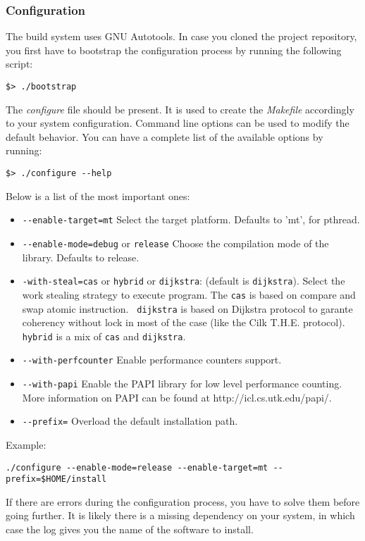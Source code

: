 \documentclass{article}
\begin{document}
\subsubsection{Configuration}
The build system uses GNU Autotools.
In case you cloned the project repository, you first have to bootstrap the
configuration process by running the following script:
\begin{verbatim}
$> ./bootstrap
\end{verbatim}
The \textit{configure} file should be present. It is used to create the
\textit{Makefile} accordingly to your system configuration. Command line
options can be used to modify the default behavior. You can have a complete
list of the available options by running:
\begin{verbatim}
$> ./configure --help
\end{verbatim}



Below is a list of the most important ones:
\begin{itemize} %
\item \verb+--enable-target=mt+\newline
Select the target platform. Defaults to 'mt', for pthread.
\item \verb+--enable-mode=debug+ or \verb+release+\newline
Choose the compilation mode of the library. Defaults to release.
\item \verb+-with-steal=cas+ or \verb+hybrid+ or \verb+dijkstra+: (default is \verb+dijkstra+). Select the work stealing strategy to execute program. The \verb+cas+ is based on compare and swap atomic instruction. \verb+ dijkstra+ is based on Dijkstra protocol to garante coherency without lock in most of the case (like the Cilk T.H.E. protocol). \verb+hybrid+ is a  mix of \verb+cas+ and \verb+dijkstra+.
\item \verb+--with-perfcounter+\newline
Enable performance counters support.
\item \verb+--with-papi+\newline
Enable the PAPI library for low level performance counting.
More information on PAPI can be found at http://icl.cs.utk.edu/papi/.
\item \verb+--prefix=+\newline
Overload the default installation path.
\end{itemize} %
Example:

\begin{verbatim}
./configure --enable-mode=release --enable-target=mt --prefix=$HOME/install
\end{verbatim}
If there are errors during the configuration process, you have to solve
them before going further. It is likely there is a missing dependency on your
system, in which case the log gives you the name of the software to install.
\end{document}
